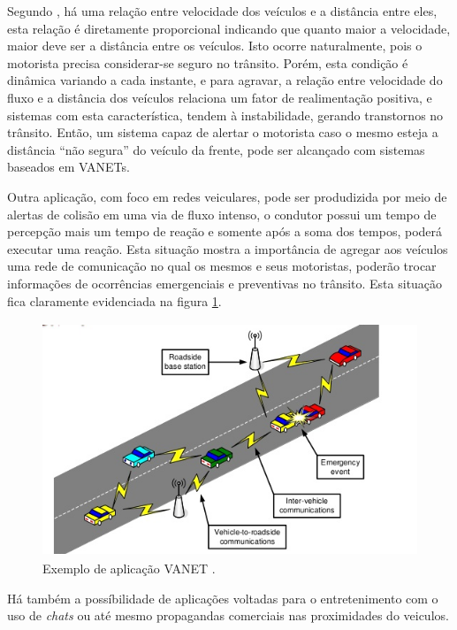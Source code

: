 \documentclass[
	12pt,				%
	oneside,			%
	a4paper,			%
	english,			%
	brazil				%
	]{abntex2ppgsi}
\begin{document}
Segundo , há uma relação entre velocidade dos veículos e a distância entre eles, esta relação é diretamente proporcional indicando que quanto maior a velocidade, maior deve ser a distância entre os veículos. Isto ocorre naturalmente, pois o motorista precisa considerar-se seguro no trânsito. Porém, esta condição é dinâmica variando a cada instante, e para agravar, a relação entre velocidade do fluxo e a distância dos veículos relaciona um fator de realimentação positiva, e sistemas com esta característica, tendem à instabilidade, gerando transtornos no trânsito. Então, um sistema capaz de alertar o motorista caso o mesmo esteja a distância ``não segura'' do veículo da frente, pode ser alcançado com sistemas baseados em VANETs. 

Outra aplicação, com foco em redes veiculares, pode ser produdizida por meio de alertas de colisão em uma via de fluxo intenso, o condutor possui um tempo de percepção mais um tempo de reação e somente após a soma dos tempos, poderá executar uma reação. Esta situação mostra a importância de agregar aos veículos uma rede de comunicação no qual os mesmos e seus motoristas, poderão trocar informações de ocorrências emergenciais e preventivas no trânsito. Esta situação fica claramente evidenciada na figura \ref{fig:vanetqian}. 

\begin{figure}[!h]
	\centering
	\includegraphics [width=12cm,height=7cm] {images/vanet_qian.png}
	\caption{Exemplo de aplicação VANET \cite{qian2008secure}.}
	\label{fig:vanetqian}
\end{figure}

Há também a possíbilidade de aplicações voltadas para o entretenimento com o uso de \textit{chats} ou até mesmo propagandas comerciais nas proximidades do veiculos.
\end{document}
